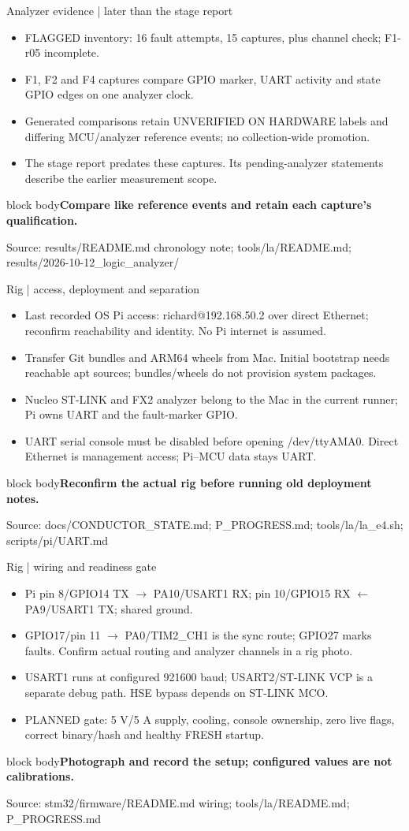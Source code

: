 \documentclass[aspectratio=169,12pt,t]{beamer}
\newcommand{\src}[1]{\par\vfill{\small\color{muted}Source: #1}}
\newcommand{\takeaway}[1]{\par\medskip\begin{beamercolorbox}[sep=2mm,wd=\linewidth]{block body}\color{navy}\textbf{#1}\end{beamercolorbox}}
\begin{document}
\begin{frame}{Analyzer evidence | later than the stage report}
\begin{itemize}
\item FLAGGED inventory: 16 fault attempts, 15 captures, plus channel check; F1-r05 incomplete.
\item F1, F2 and F4 captures compare GPIO marker, UART activity and state GPIO edges on one analyzer clock.
\item Generated comparisons retain UNVERIFIED ON HARDWARE labels and differing MCU/analyzer reference events; no collection-wide promotion.
\item The stage report predates these captures. Its pending-analyzer statements describe the earlier measurement scope.
\end{itemize}
\takeaway{Compare like reference events and retain each capture’s qualification.}\src{results/README.md chronology note; tools/la/README.md; results/2026-10-12\_logic\_analyzer/}
\end{frame}
\begin{frame}{Rig | access, deployment and separation}
\begin{itemize}
\item Last recorded OS Pi access: richard@192.168.50.2 over direct Ethernet; reconfirm reachability and identity. No Pi internet is assumed.
\item Transfer Git bundles and ARM64 wheels from Mac. Initial bootstrap needs reachable apt sources; bundles/wheels do not provision system packages.
\item Nucleo ST-LINK and FX2 analyzer belong to the Mac in the current runner; Pi owns UART and the fault-marker GPIO.
\item UART serial console must be disabled before opening /dev/ttyAMA0. Direct Ethernet is management access; Pi–MCU data stays UART.
\end{itemize}
\takeaway{Reconfirm the actual rig before running old deployment notes.}\src{docs/CONDUCTOR\_STATE.md; P\_PROGRESS.md; tools/la/la\_e4.sh; scripts/pi/UART.md}
\end{frame}
\begin{frame}{Rig | wiring and readiness gate}
\begin{itemize}
\item Pi pin 8/GPIO14 TX $\rightarrow$ PA10/USART1 RX; pin 10/GPIO15 RX $\leftarrow$ PA9/USART1 TX; shared ground.
\item GPIO17/pin 11 $\rightarrow$ PA0/TIM2\_CH1 is the sync route; GPIO27 marks faults. Confirm actual routing and analyzer channels in a rig photo.
\item USART1 runs at configured 921600 baud; USART2/ST-LINK VCP is a separate debug path. HSE bypass depends on ST-LINK MCO.
\item PLANNED gate: 5 V/5 A supply, cooling, console ownership, zero live flags, correct binary/hash and healthy FRESH startup.
\end{itemize}
\takeaway{Photograph and record the setup; configured values are not calibrations.}\src{stm32/firmware/README.md wiring; tools/la/README.md; P\_PROGRESS.md}
\end{frame}
\end{document}
